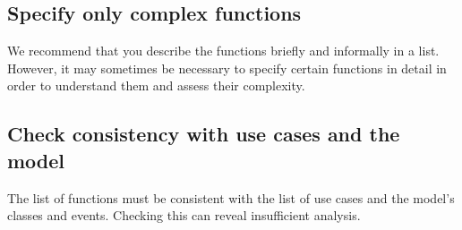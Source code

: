 \subsection{Specify only complex functions}
We recommend that you describe the functions briefly and informally in a list. However, it may sometimes be necessary to specify certain functions in detail in order to understand them and assess their complexity.

\subsection{Check consistency with use cases and the model}
The list of functions must be consistent with the list of use cases and the model's classes and events. Checking this can reveal insufficient analysis.